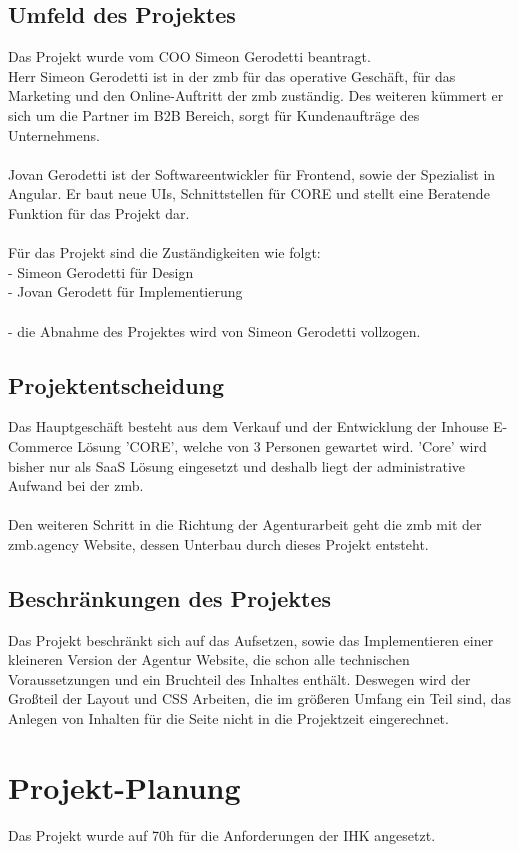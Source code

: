 \documentclass[11pt,a4paper]{article}
\begin{document}
\subsection{Umfeld des Projektes}
Das Projekt wurde vom COO Simeon Gerodetti beantragt.\\
Herr Simeon Gerodetti ist in der zmb für das operative Geschäft, für das Marketing und den Online-Auftritt der zmb zuständig.
Des weiteren kümmert er sich um die Partner im \acs{B2B} Bereich, sorgt für Kundenaufträge des Unternehmens.\\\\
Jovan Gerodetti ist der Softwareentwickler für Frontend, sowie der Spezialist in Angular. Er baut neue UIs, Schnittstellen für CORE und stellt eine Beratende Funktion für das Projekt dar.\\\\
Für das Projekt sind die Zuständigkeiten wie folgt:\\
- Simeon Gerodetti für Design\\
- Jovan Gerodett für Implementierung\\\\
- die Abnahme des Projektes wird von Simeon Gerodetti vollzogen.
\subsection{Projektentscheidung}
Das Hauptgeschäft besteht aus dem Verkauf und der Entwicklung der Inhouse E-Commerce Lösung 'CORE', welche von 3 Personen gewartet wird. 'Core' wird bisher nur als SaaS Lösung eingesetzt und deshalb liegt der administrative Aufwand bei der zmb.\\\\
Den weiteren Schritt in die Richtung der Agenturarbeit geht die zmb mit der zmb.agency Website, dessen Unterbau durch dieses Projekt entsteht.
\subsection{Beschränkungen des Projektes}
Das Projekt beschränkt sich auf das Aufsetzen, sowie das Implementieren einer kleineren Version der Agentur Website, die schon alle technischen Voraussetzungen und ein Bruchteil des Inhaltes enthält. Deswegen wird der Großteil der Layout und CSS Arbeiten, die im größeren Umfang ein Teil sind, das Anlegen von Inhalten für die Seite nicht in die Projektzeit eingerechnet.
\section{Projekt-Planung}
Das Projekt wurde auf 70h für die Anforderungen der IHK angesetzt.
\end{document}

